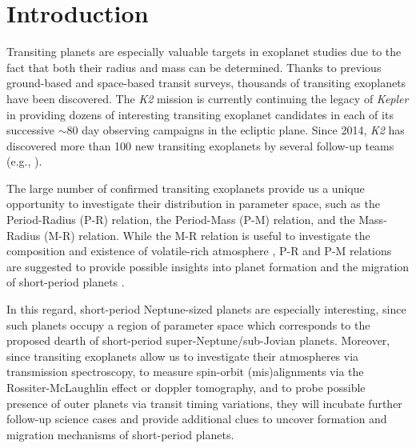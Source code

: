 \documentclass[]{pasj01}
\begin{document}
\section{Introduction}

Transiting planets are especially valuable targets in exoplanet studies due to the 
fact that both their radius and mass can be determined.
Thanks to previous ground-based and space-based transit surveys,
thousands of transiting exoplanets have been discovered.
The {\it K2} mission \citep{2014PASP..126..398H} is currently continuing the legacy of
{\it Kepler} in providing dozens of interesting transiting exoplanet candidates
in each of its successive $\sim 80$ day observing campaigns in the ecliptic plane.
Since 2014, {\it K2} has discovered  more than 100 new transiting exoplanets by
several follow-up teams (e.g., \cite{2015ApJ...804...10C,2015ApJ...812..112S,
2016arXiv160107635L,2016ApJ...818...46M,2016ApJS..226....7C}).

The large number of confirmed transiting exoplanets provide us
a unique opportunity to investigate their distribution in parameter space, such as 
the Period-Radius (P-R) relation, the Period-Mass (P-M) relation, and 
the Mass-Radius (M-R) relation.
While the M-R relation is useful to investigate the composition and
existence of volatile-rich atmosphere \citep{2013PASP..125..227Z},
P-R and P-M relations are suggested to provide possible insights into
planet formation and the migration of short-period planets
\citep{2013ApJ...763...12B,2013A&A...560A..51A,2016MNRAS.455L..96H,2016A&A...589A..75M}.

In this regard, short-period Neptune-sized planets are especially interesting,
since such planets occupy a region of parameter space which corresponds to the proposed dearth
of short-period super-Neptune/sub-Jovian planets.
Moreover, since transiting exoplanets allow us to investigate their atmospheres via transmission spectroscopy,
to measure spin-orbit (mis)alignments via the Rossiter-McLaughlin effect or doppler tomography,
and to probe possible presence of outer planets via transit timing variations,
they will incubate further follow-up science cases and provide
additional clues to uncover formation and migration mechanisms of
short-period planets.
\end{document}

